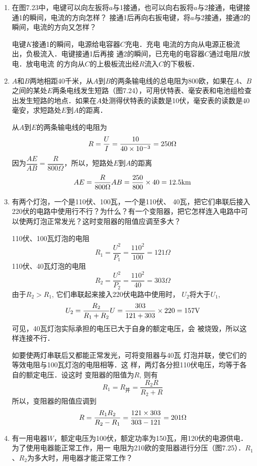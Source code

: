 \begin{enumerate}
    \item 在图7.23中，电键可以向左扳将$a$与1接通，也可以向右扳将$a$与2接通，电键接通1的瞬间，电流的方向怎样？
接通1后再向右扳电键，将$a$与2接通，接通2的瞬间，电流的方向又怎样？

\begin{solution}
    电键$K$接通1的瞬间，电源给电容器$C$充电．充电
    电流的方向从电源正极流出，负极流入．电键接通1后再接
    通2的瞬间，已充电的电容器$C$通过电阻$R$放电．放电电流
    的方向从$C$的上极板流出经$R$流入$C$的下极板．
\end{solution}

\item $A$和$B$两地相距40千米，从$A$到$B$的两条输电线的总电阻为800欧，如果在$A$、$B$之间的某处$E$两条电线发生短路（图7.24），可用伏特表、毫安表和电池组检查出发生短路的地点．如果在$A$处测得伏特表的读数是10伏，毫安表的读数是40毫安，求短路处$E$到$A$的距离．

\begin{solution}
    从$A$到$E$的两条输电线的电阻为
\[R=\frac{U}{I}=\frac{10}{40\times 10^{-3}}=250\Omega\]
因为$\dfrac{AE}{AB}=\dfrac{R}{800\Omega}$，所以，短路处$E$到$A$的距离
\[AE=\frac{R}{800\Omega}AB=\frac{250}{800}\times 40=12.5{\rm km}\]
\end{solution}

\item 有两个灯泡，一个是110伏、100瓦，一个是110伏、
40瓦，把它们串联后接入220伏的电路中使用行不行？为什么？有一个变阻器，把它怎样连入电路中可以使两灯泡正常发光？这时变阻器的阻值应调至多大？

\begin{solution}
110伏、100瓦灯泡的电阻
\[R_1=\frac{U^2}{P_1}=\frac{110^2}{100}=121\Omega\]
110伏、40瓦灯泡的电阻
\[R_2=\frac{U^2}{P_2}=\frac{110^2}{40}=303\Omega\]
由于$R_2>R_1$, 它们串联起来接入220伏电路中使用时，
$U_2$将大于$U_1$, 
\[U_2=\frac{R_2}{R_1+R_2}U=\frac{303}{121+303}\times 220=157{\rm V}\]
可见，40瓦灯泡实际承担的电压已大于自身的额定电压，会
被烧毁，所以这样连接不行．

如要使两灯串联后又都能正常发光，可将变阻器与40瓦
灯泡并联，使它们的等效电阻与100瓦灯泡的电阻相等．这
样，两灯各分担110伏电压，均等于各自的额定电压．设这时
变阻器的阻值为$R$, 则有
\[R_1=R_{\text{并}}=\frac{R_2R}{R_2+R}\]
所以，变阻器的阻值应调到
\[R=\frac{R_1R_2}{R_2-R_1}=\frac{121\times 303}{303-121}=201\Omega\]
\end{solution}

\item 有一用电器$W$，额定电压为100伏，额定功率为150瓦，用120伏的电源供电．为了使用电器能正常工作，用一
电阻为210欧的变阻器进行分压（图7.25）．$R_1$、$R_2$为多大时，用电器才能正常工作？


\end{enumerate}
